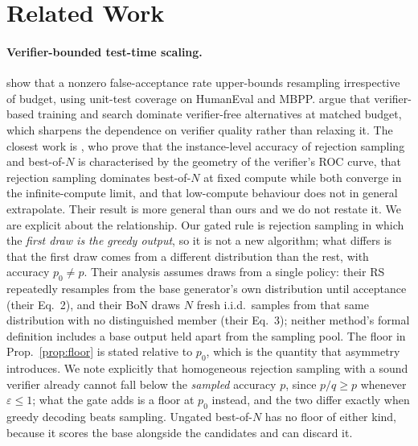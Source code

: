 \documentclass[11pt]{article}
\begin{document}
\section{Related Work}\label{sec:related}
\paragraph{Verifier-bounded test-time scaling.} \citet{stroebl2024verifier} show that a nonzero false-acceptance rate upper-bounds resampling irrespective of budget, using unit-test coverage on HumanEval and MBPP. \citet{setlur2025vbvf} argue that verifier-based training and search dominate verifier-free alternatives at matched budget, which sharpens the dependence on verifier quality rather than relaxing it. The closest work is \citet{dorner2025rocnreroll}, who prove that the instance-level accuracy of rejection sampling and best-of-$N$ is characterised by the geometry of the verifier's ROC curve, that rejection sampling dominates best-of-$N$ at fixed compute while both converge in the infinite-compute limit, and that low-compute behaviour does not in general extrapolate. Their result is more general than ours and we do not restate it. We are explicit about the relationship. Our gated rule is rejection sampling in which the \emph{first draw is the greedy output}, so it is not a new algorithm; what differs is that the first draw comes from a different distribution than the rest, with accuracy $p_0\neq p$. Their analysis assumes draws from a single policy: their RS repeatedly resamples from the base generator's own distribution until acceptance (their Eq.~2), and their BoN draws $N$ fresh i.i.d.\ samples from that same distribution with no distinguished member (their Eq.~3); neither method's formal definition includes a base output held apart from the sampling pool. The floor in Prop.~\ref{prop:floor} is stated relative to $p_0$, which is the quantity that asymmetry introduces. We note explicitly that homogeneous rejection sampling with a sound verifier already cannot fall below the \emph{sampled} accuracy $p$, since $p/q\ge p$ whenever $\varepsilon\le1$; what the gate adds is a floor at $p_0$ instead, and the two differ exactly when greedy decoding beats sampling. Ungated best-of-$N$ has no floor of either kind, because it scores the base alongside the candidates and can discard it.
\end{document}
